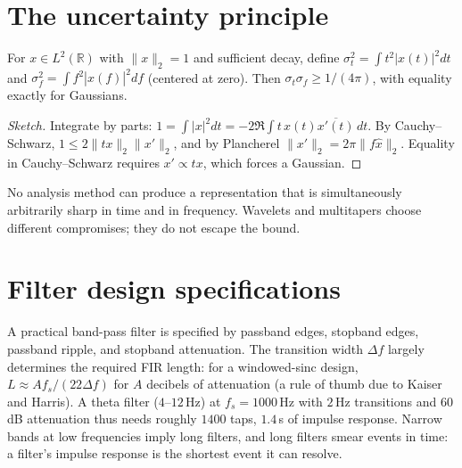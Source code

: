 \section{The uncertainty principle}
\begin{theorem}
For $x\in L^2(\mathbb R)$ with $\|x\|_2=1$ and sufficient decay, define $\sigma_t^2=\int t^2|x(t)|^2dt$ and $\sigma_f^2=\int f^2|\hat x(f)|^2df$ (centered at zero). Then $\sigma_t\sigma_f\ge1/(4\pi)$, with equality exactly for Gaussians.
\end{theorem}
\begin{proof}[Sketch]
Integrate by parts: $1=\int|x|^2dt=-2\Re\int t\,x(t)\overline{x'(t)}\,dt$. By Cauchy--Schwarz, $1\le2\|tx\|_2\|x'\|_2$, and by Plancherel $\|x'\|_2=2\pi\|f\hat x\|_2$. Equality in Cauchy--Schwarz requires $x'\propto tx$, which forces a Gaussian.
\end{proof}
No analysis method can produce a representation that is simultaneously arbitrarily sharp in time and in frequency. Wavelets and multitapers choose different compromises; they do not escape the bound.

\section{Filter design specifications}
A practical band-pass filter is specified by passband edges, stopband edges, passband ripple, and stopband attenuation. The transition width $\Delta f$ largely determines the required FIR length: for a windowed-sinc design, $L\approx A f_s/(22\Delta f)$ for $A$ decibels of attenuation (a rule of thumb due to Kaiser and Harris). A theta filter ($4$--$12$\,Hz) at $f_s=1000$\,Hz with $2$\,Hz transitions and $60$\,dB attenuation thus needs roughly $1400$ taps, $1.4$\,s of impulse response. Narrow bands at low frequencies imply long filters, and long filters smear events in time: a filter's impulse response is the shortest event it can resolve.


